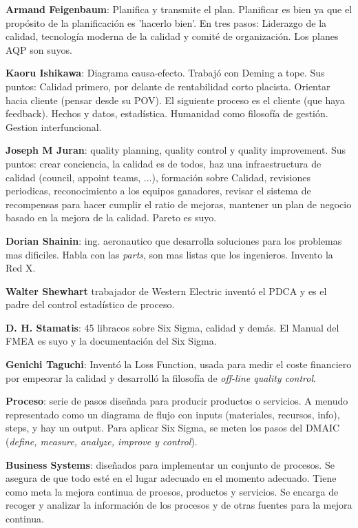 \documentclass[]{article}
\begin{document}
\textbf{Armand Feigenbaum}: Planifica y transmite el plan. Planificar es bien ya que el propósito de la planificación es 'hacerlo bien'. En tres pasos: Liderazgo de la calidad, tecnología moderna de la calidad y comité de organización. Los planes AQP son suyos. 

\textbf{Kaoru Ishikawa}: Diagrama causa-efecto. Trabajó con Deming a tope. Sus puntos: Calidad primero, por delante de rentabilidad corto placista. Orientar hacia cliente (pensar desde su POV). El siguiente proceso es el cliente (que haya feedback). Hechos y datos, estadística. Humanidad como filosofía de gestión. Gestion interfuncional. 

\textbf{Joseph M Juran}: quality planning, quality control y quality improvement. Sus puntos: crear conciencia, la calidad es de todos, haz una infraestructura de calidad (council, appoint teams, ...), formación sobre Calidad, revisiones periodicas, reconocimiento a los equipos ganadores, revisar el sistema de recompensas para hacer cumplir el ratio de mejoras, mantener un plan de negocio basado en la mejora de la calidad. Pareto es suyo. 

\textbf{Dorian Shainin}: ing. aeronautico que desarrolla soluciones para los problemas mas dificiles. Habla con las \textit{parts}, son mas listas que los ingenieros. Invento la Red X.

\textbf{Walter Shewhart} trabajador de Western Electric inventó el PDCA y es el padre del control estadístico de proceso. 

\textbf{D. H. Stamatis}: 45 libracos sobre Six Sigma, calidad y demás. El Manual del FMEA es suyo y la documentación del Six Sigma.

\textbf{Genichi Taguchi}: Inventó la Loss Function, usada para medir el coste financiero por empeorar la calidad y desarrolló la filosofía de \textit{off-line quality control}. 

\textbf{Proceso}: serie de pasos diseñada para producir productos o servicios. A menudo representado como un diagrama de flujo con inputs (materiales, recursos, info), steps, y hay un output. Para aplicar Six Sigma, se meten los pasos del DMAIC (\textit{define, measure, analyze, improve y control}). 

\textbf{Business Systems}: diseñados para implementar un conjunto de procesos. Se asegura de que todo esté en el lugar adecuado en el momento adecuado. Tiene como meta la mejora continua de proesos, productos y servicios. Se encarga de recoger y analizar la información de los procesos y de otras fuentes para la mejora continua.  
\end{document}
